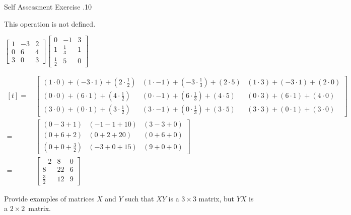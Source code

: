 \documentclass[\main/notes.tex]{subfiles}
\begin{document}
\begin{exercise}{Self Assessment Exercise \thechapter.10}
\begin{questions}
\begin{questions}
									{\answer This operation is not defined.}
								\item $\begin{bmatrix}
									1 & -3 & 2\\
									0 & 6 & 4\\
									3 & 0 & 3
								\end{bmatrix} \begin{bmatrix}
									0 & -1 & 3\\
									1 & \frac{1}{3} & 1\\
									\frac{1}{2} & 5 & 0
								\end{bmatrix}$ \\
								\begin{answer}
									$ \begin{aligned}[t]
										= \, &\begin{bmatrix}
														(1 \cdot 0) + (-3 \cdot 1) + \left(2 \cdot \frac{1}{2}\right) & (1 \cdot - 1) + \left(-3 \cdot \frac{1}{3}\right) + (2 \cdot 5) & (1 \cdot 3) + (-3 \cdot 1) + (2 \cdot 0)\\
														(0 \cdot 0) + (6 \cdot 1) + \left(4 \cdot \frac{1}{2}\right) & (0 \cdot -1) + \left(6 \cdot \frac{1}{3}\right) + (4 \cdot 5) & (0 \cdot 3) + (6 \cdot 1) + (4 \cdot 0)\\
														(3 \cdot 0) + (0 \cdot 1) + \left(3 \cdot \frac{1}{2}\right) & (3 \cdot -1) + \left(0 \cdot \frac{1}{3}\right) + (3 \cdot 5) & (3 \cdot 3) + (0 \cdot 1) + (3 \cdot 0)
													\end{bmatrix}\\
										= \, &\begin{bmatrix}
														(0 - 3 + 1) & (- 1 - 1 + 10) & (3 - 3 + 0)\\
														(0 + 6 + 2) & (0 + 2 + 20) & (0 + 6 + 0)\\
														\left(0 + 0 + \frac{3}{2}\right) & (-3 + 0 + 15) & (9 + 0 + 0)
													\end{bmatrix}\\
										= \, &\begin{bmatrix}
														-2 & 8 & 0\\
														8 & 22 & 6\\
														\frac{3}{2} & 12 & 9
													\end{bmatrix}
									\end{aligned}$
								\end{answer}
							\end{questions}
						\item Provide examples of matrices $X$ and $Y$ such that $XY$ is a $3 \times 3$ matrix, but $YX$ is a $2 \times 2$~matrix.\\

\end{questions}
\end{exercise}
\end{document}
